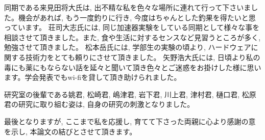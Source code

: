 同期である来見田将大氏は, 出不精な私を色々な場所に連れて行って下さいました。機会があれば, もう一度釣りに行き, 今度はちゃんとした釣果を得たいと思っています。
荘司大志氏には, 同じ加速器実験をしている同期として様々な事を相談させて頂きました。また, 食や生活に対するセンスなど見習うところが多く, 勉強させて頂きました。
松本岳氏には, 学部生の実験の頃より, ハードウェアに関する技術力をとても頼りにさせて頂きました。
矢野浩大氏には, 日頃より私の毒にも薬にもならない話を延々と聞いて頂き色々とご迷惑をお掛けした様に思います。学会発表でもwi-fiを貸して頂き助けられました。

研究室の後輩である姚君, 松崎君, 嶋津君, 岩下君, 川上君, 津村君, 樋口君, 松原君の研究に取り組む姿は, 自身の研究の刺激となりました。

最後となりますが, ここまで私を応援し, 育てて下さった両親に心より感謝の意を示し, 本論文の結びとさせて頂きます。






